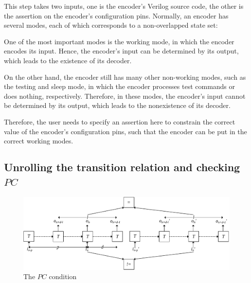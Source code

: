 \documentclass[runningheads,a4paper]{llncs}
\begin{document}
This step takes two inputs,
one is the encoder's Verilog source code,
the other is the assertion on the encoder's configuration pins.
Normally,
an encoder has several modes,
each of which corresponds to a non-overlapped state set:

One of the most important modes is the working mode,
in which the encoder encodes its input.
Hence,
the encoder's input can be determined by its output,
which leads to the existence of its decoder.

On the other hand,
the encoder still has many other non-working modes,
such as the testing and sleep mode,
in which the encoder processes test commands or does nothing,
respectively.
Therefore,
in these modes,
the encoder's input cannot be determined by its output,
which leads to the nonexistence of its decoder.

Therefore,
the user needs to specify an assertion here to constrain the correct value of the encoder's configuration pins,
such that the encoder can be put in the correct working modes.


%

\subsection{Unrolling the transition relation and checking $PC$}

\begin{figure}[t]
\begin{center}
\includegraphics[width=\textwidth]{pc}
\end{center}
\caption{The $PC$ condition}
  \label{fig_pc}
\end{figure}
\end{document}

